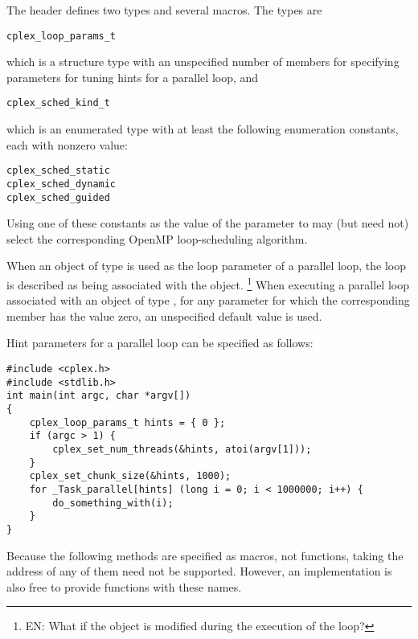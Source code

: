 

\pnum
The header
defines two types and several macros.
The types are
\begin{verbatim}
cplex_loop_params_t
\end{verbatim}
which is a structure type
with an unspecified number of members
for specifying parameters for tuning hints for a parallel loop,
and
\begin{verbatim}
cplex_sched_kind_t
\end{verbatim}
which is an enumerated type
with at least the following enumeration constants,
each with nonzero value:
\begin{verbatim}
cplex_sched_static
cplex_sched_dynamic
cplex_sched_guided
\end{verbatim}

\begin{note}
Using one of these constants as the value of the
parameter to
may (but need not)
select the corresponding OpenMP loop-scheduling algorithm.
\end{note}

\pnum
When an object of type
is used as the loop parameter of a parallel loop,
the loop is described as being associated with the object.%
\footnote{EN:
What if the object is modified during the execution of the loop?
}
When executing a parallel loop associated with an object of type
,
for any parameter for which the corresponding member has the value zero,
an unspecified default value is used.

\begin{example}
Hint parameters for a parallel loop can be specified as follows:
\begin{verbatim}
#include <cplex.h>
#include <stdlib.h>
int main(int argc, char *argv[])
{
    cplex_loop_params_t hints = { 0 };
    if (argc > 1) {
        cplex_set_num_threads(&hints, atoi(argv[1]));
    }
    cplex_set_chunk_size(&hints, 1000);
    for _Task_parallel[hints] (long i = 0; i < 1000000; i++) {
        do_something_with(i);
    }
}
\end{verbatim}
\end{example}

\begin{note}
Because the following methods are specified as macros,
not functions,
taking the address of any of them need not be supported.
However, an implementation is also free
to provide functions with these names.
\end{note}

